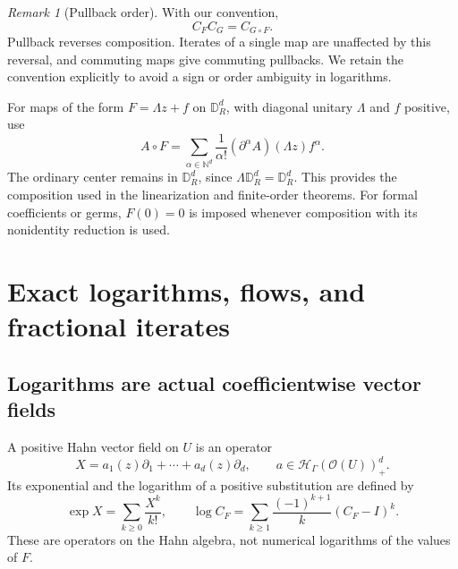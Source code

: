 \documentclass[11pt,letterpaper]{article}
\theoremstyle{definition}
\theoremstyle{remark}
\newtheorem{remark}[remark]{Remark}
\newcommand{\N}{\mathbb N}
\newcommand{\HH}{\mathscr H}
\newcommand{\OO}{\mathcal O}
\newcommand{\DR}{\mathbb D_R^d}
\numberwithin{equation}{section}
\begin{document}
\begin{remark}[Pullback order]
With our convention,
\begin{equation}\label{eq:pullback-order}
 C_FC_G=C_{G\circ F}.
\end{equation}
Pullback reverses composition. Iterates of a single map are unaffected by
this reversal, and commuting maps give commuting pullbacks. We retain the
convention explicitly to avoid a sign or order ambiguity in logarithms.
\end{remark}

For maps of the form $F=\Lambda z+f$ on $\DR$, with diagonal unitary
$\Lambda$ and $f$ positive, use
\begin{equation}\label{eq:rotation-substitution}
 A\circ F=
 \sum_{\alpha\in\N^d}\frac{1}{\alpha!}
           (\partial^\alpha A)(\Lambda z) f^\alpha.
\end{equation}
The ordinary center remains in $\DR$, since $\Lambda\DR=\DR$.
This provides the composition used in the linearization and finite-order
theorems. For formal coefficients or germs, $F(0)=0$ is imposed whenever
composition with its nonidentity reduction is used.

\section{Exact logarithms, flows, and fractional iterates}\label{sec:flows}

\subsection{Logarithms are actual coefficientwise vector fields}
A positive Hahn vector field on $U$ is an operator
\[
 X=a_1(z)\partial_1+\cdots+a_d(z)\partial_d,
 \qquad a\in\HH_\Gamma(\OO(U))_+^d.
\]
Its exponential and the logarithm of a positive substitution are defined by
\begin{equation}\label{eq:explog}
 \exp X=\sum_{k\ge0}\frac{X^k}{k!},\qquad
 \log C_F=\sum_{k\ge1}\frac{(-1)^{k+1}}{k}(C_F-I)^k.
\end{equation}
These are operators on the Hahn algebra, not numerical logarithms of the
values of $F$.
\end{document}
